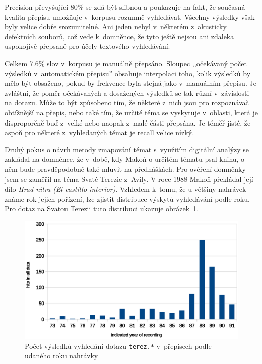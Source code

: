 Precision převyšující 80\% se zdá být slibnou a poukazuje na fakt, že současná
kvalita přepisu umožňuje v~korpusu rozumně vyhledávat. Všechny výsledky však
byly velice dobře srozumitelné. Ani jeden nebyl v~některém z~akusticky
defektních souborů, což vede k~domněnce, že tyto ještě nejsou ani zdaleka
uspokojivě přepsané pro účely textového vyhledávání.

Celkem 7.6\% slov v~korpusu je manuálně přepsáno. Sloupec ,,očekávaný počet
výsledků v~automatickém přepisu'' obsahuje interpolaci toho, kolik výsledků by
mělo být obsaženo, pokud by frekvence byla stejná jako v~manuálním přepisu. Je
zvláštní, že poměr očekávaných a dosažených výsledků se tak různí v~závislosti
na dotazu. Může to být způsobeno tím, že některé z~nich jsou pro rozpoznávač
obtížnější na přepis, nebo také tím, že určité téma se vyskytuje v~oblasti,
která je disproporčně buď z~velké nebo naopak z~malé části přepsána. Je téměř
jisté, že aspoň pro některé z~vyhledaných témat je recall velice nízký.

Druhý pokus o návrh metody zmapování témat s~využitím digitální analýzy se zakládal na
domněnce, že v~době, kdy Makoň o určitém tématu psal knihu, o něm bude
pravděpodobně také mluvit na přednáškách. Pro ověření domněnky jsem se zaměřil
na téma Svaté Terezie z~Avily. V roce 1988 Makoň překládal její dílo {\em Hrad nitra
(El castillo interior)}. Vzhledem k~tomu, že u většiny nahrávek známe rok jejich
pořízení, lze zjistit distribuce výskytů vyhledávání podle roku. Pro dotaz na
Svatou Terezii tuto distribuci ukazuje obrázek~\ref{fig:teresa-year}.

\begin{figure}[htpb]
\includegraphics[scale=0.8]{rc/teresa-by-year.eps}
\caption{Počet výsledků vyhledání dotazu \texttt{terez.*} v~přepisech podle
udaného roku nahrávky}
\label{fig:teresa-year}
\end{figure}

